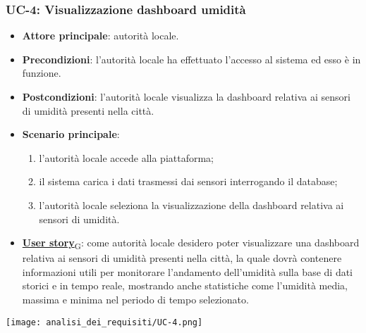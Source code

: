 \subsubsection{UC-4: Visualizzazione dashboard umidità}
\begin{itemize}
	\item \textbf{Attore principale}: autorità locale.
	\item \textbf{Precondizioni}: l'autorità locale ha effettuato l'accesso al sistema ed esso è in funzione.
	\item \textbf{Postcondizioni}: l'autorità locale visualizza la dashboard relativa
	      ai sensori di umidità presenti nella città.
	\item \textbf{Scenario principale}:
	      \begin{enumerate}
		      \item l'autorità locale accede alla piattaforma;
		      \item il sistema carica i dati trasmessi dai sensori interrogando il database;
		      \item l'autorità locale seleziona la visualizzazione della dashboard relativa ai sensori di umidità.
	      \end{enumerate}
	\item \href{https://7last.github.io/docs/rtb/documentazione-interna/glossario\#user-story}{\textbf{User story}\textsubscript{G}}:
	      come autorità locale desidero poter visualizzare una dashboard relativa ai sensori di umidità presenti nella città, la quale
	      dovrà contenere informazioni utili per monitorare l'andamento dell'umidità sulla base di dati storici e in tempo reale, mostrando
	      anche statistiche come l'umidità media, massima e minima nel periodo di tempo selezionato.
\end{itemize}
\begin{center}
	\texttt{[image: analisi\_dei\_requisiti/UC-4.png]}
\end{center}


